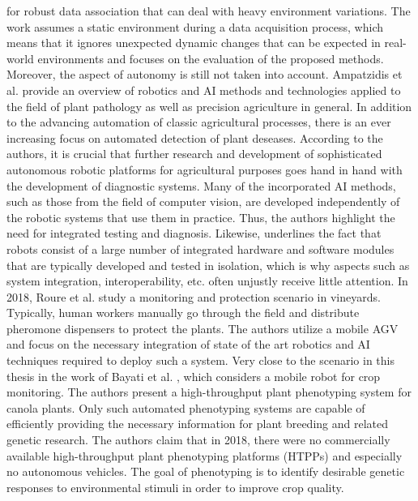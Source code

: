 \documentclass[english, master, utf8]{base/thesis_KBS}
\begin{document}
for robust data association that can deal with heavy environment variations. The work assumes a static environment during a data acquisition process, which means that it ignores
unexpected dynamic changes that can be expected in real-world environments and focuses on the evaluation of the proposed methods. Moreover, the aspect of autonomy is still not taken
into account.\newline
Ampatzidis et al. \cite{Ampatzidis:2017} provide an overview of robotics and AI methods and technologies applied to the field of plant pathology as well as precision agriculture
in general. In addition to the advancing automation of classic agricultural processes, there is an ever increasing focus on automated detection of plant deseases.
\cite{Ampatzidis:2017} According to the authors, it is crucial that further research and development of sophisticated autonomous robotic platforms for agricultural purposes
goes hand in hand with the development of diagnostic systems. Many of the incorporated AI methods, such as those from the field of computer vision, are developed independently of
the robotic systems that use them in practice. \cite{Ampatzidis:2017} Thus, the authors highlight the need for integrated testing and diagnosis.
Likewise, \cite{Roucek:2021} underlines the fact that robots consist of a large number of integrated hardware and software modules that are typically developed and
tested in isolation, which is why aspects such as system integration, interoperability, etc. often unjustly receive little attention.\newline
In 2018, Roure et al. \cite{Roure:2018} study a monitoring and protection scenario in vineyards. Typically, human workers manually go through the field and distribute pheromone dispensers
to protect the plants. \cite{Roure:2018} The authors utilize a mobile AGV and focus on the necessary integration of state of the art robotics and AI techniques required to deploy
such a system.\newline
Very close to the scenario in this thesis in the work of Bayati et al. \cite{Bayati:2018}, which considers a mobile robot for crop monitoring. The authors present a high-throughput
plant phenotyping system for canola plants. Only such automated phenotyping systems are capable of efficiently providing the necessary information for plant breeding and related
genetic research. \cite{Bayati:2018} The authors claim that in 2018, there were no commercially available high-throughput plant phenotyping platforms (HTPPs) and especially no
autonomous vehicles. The goal of phenotyping is to identify desirable genetic responses to environmental stimuli in order to improve crop quality. \cite{Bayati:2018}
\end{document}
